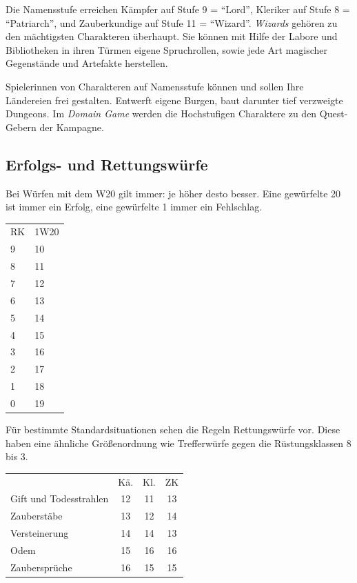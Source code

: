 \documentclass[11pt]{wbzine}
\begin{document}
\begin{multicols}{2}
    Die Namensstufe erreichen Kämpfer auf Stufe 9 = ``Lord'',
    Kleriker auf Stufe 8 = ``Patriarch'', und Zauberkundige auf
    Stufe 11 = ``Wizard''. \textit{Wizards} gehören zu den
    mächtigsten Charakteren überhaupt. Sie können mit Hilfe der
    Labore und Bibliotheken in ihren Türmen eigene Spruchrollen,
    sowie jede Art magischer Gegenstände und Artefakte herstellen.

    Spielerinnen von Charakteren auf Namensstufe können und
    sollen Ihre Ländereien frei gestalten. Entwerft eigene Burgen,
    baut darunter tief verzweigte Dungeons. Im \textit{Domain Game}
    werden die Hochstufigen Charaktere zu den Quest-Gebern der
    Kampagne.


    \subsection{Erfolgs- und Rettungswürfe}

    Bei Würfen mit dem W20 gilt immer: je höher desto besser. Eine
    gewürfelte 20 ist immer ein Erfolg, eine gewürfelte 1 immer ein
    Fehlschlag.

    \begin{tabularx}{\columnwidth}{YY}
       RK  & 1W20 \\
       9  &    10 \\
       8  &    11 \\
       7  &    12 \\
       6  &    13 \\
       5  &    14 \\
       4  &    15 \\
       3  &    16 \\
       2  &    17 \\
       1  &    18 \\
       0  &    19 \\
    \end{tabularx}
   
    Für bestimmte Standardsituationen sehen die Regeln Rettungswürfe
    vor. Diese haben eine ähnliche Größenordnung wie Trefferwürfe
    gegen die Rüstungsklassen 8 bis 3.

    \begin{tabularx}{\columnwidth}{Yccc}
            & Kä. & Kl. & ZK \\
	Gift und Todesstrahlen & 12 & 11 & 13 \\
	Zauberstäbe & 13 & 12 & 14 \\
	Versteinerung & 14 & 14 & 13 \\
	Odem & 15 & 16 & 16 \\
	Zaubersprüche & 16 & 15 & 15 \\ 
    \end{tabularx}


\end{multicols}
\end{document}
